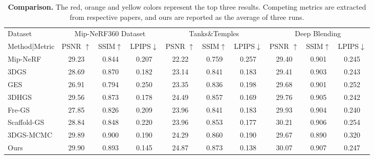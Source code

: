 \documentclass[letterpaper]{article} %
\begin{document}
\begin{table}[tb]
\begin{tabular}{l|ccc|ccc|ccc}
\bottomrule
    Dataset & \multicolumn{3}{c|}{Mip-NeRF360 Dataset}  & \multicolumn{3}{c|}{Tanks\&Temples} & \multicolumn{3}{c}{Deep Blending}\\
    Method|Metric & PSNR $\uparrow$   & SSIM$\uparrow$   & LPIPS$\downarrow$ & PSNR $\uparrow$   & SSIM$\uparrow$   & LPIPS$\downarrow$ & PSNR $\uparrow$   & SSIM$\uparrow$   & LPIPS$\downarrow$ \\
    \hline
    Mip-NeRF & 29.23 & 0.844 & 0.207 & 22.22 & 0.759 & 0.257 & 29.40 & 0.901 & 0.245\\
    3DGS & 28.69 & 0.870 & \cellcolor{yellow!40}0.182 & 23.14 & 0.841 & 0.183 & 29.41 & 0.903 & \cellcolor{yellow!40}0.243\\
    GES & 26.91 & 0.794 & 0.250 & 23.35 & 0.836 & 0.198 & 29.68 & 0.901 & 0.252\\
    3DHGS & \cellcolor{yellow!40}29.56 & \cellcolor{yellow!40}0.873 & \cellcolor{orange!40}0.178 & \cellcolor{orange!40}24.49 & \cellcolor{yellow!40}0.857 & \cellcolor{orange!40}0.169 & 29.76 & \cellcolor{yellow!40}0.905 & \cellcolor{orange!40}0.242\\
    Fre-GS & 27.85 & 0.826 & 0.209 & 23.96 & 0.841 & 0.183 & \cellcolor{yellow!40}29.93 & 0.904 & \cellcolor{red!40}0.240\\
    Scaffold-GS & 28.84 & 0.848 & 0.220 & 23.96 & 0.853 & \cellcolor{yellow!40}0.177 & \cellcolor{red!40}30.21 & \cellcolor{orange!40}0.906 & 0.254\\
    3DGS-MCMC & \cellcolor{orange!40}29.89 & \cellcolor{red!40}0.900 & 0.190 & \cellcolor{yellow!40}24.29 & \cellcolor{orange!40}0.860 & 0.190 & 29.67 & 0.890 & 0.320\\
    \midrule
    Ours & \cellcolor{red!40}29.90 & \cellcolor{orange!40}0.893 & \cellcolor{red!40}0.145 & \cellcolor{red!40}24.87 & \cellcolor{red!40} 0.873 & \cellcolor{red!40} 0.138 & \cellcolor{orange!40}30.07 & \cellcolor{red!40}0.907 & 0.247\\
    \bottomrule
\end{tabular}
\caption{
    \textbf{Comparison.} The red, orange and yellow colors represent the top three results. Competing metrics are extracted from respective papers, and ours are reported as the average of three runs.
}
\label{tab:comparisons}
\end{table}
\end{document}
